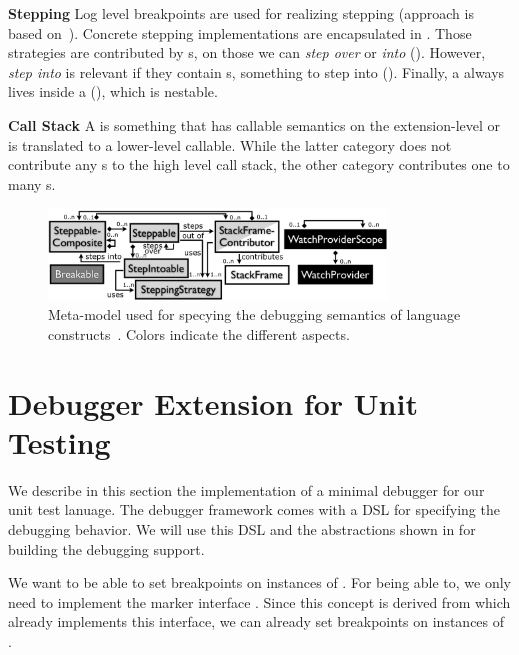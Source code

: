 \noindent \textbf{Stepping} Log level breakpoints are used for realizing
stepping (approach is based on~\cite{Wu06grammar}). Concrete
stepping implementations are encapsulated in
.
Those strategies are contributed by s, on those 
we can \emph{step over} or \emph{into} (\eg {}). 
However, \emph{step into} is relevant if 
they contain s, something to step into
(\eg {}). Finally, a  always lives inside a
 (\eg {}), which is nestable.

\noindent \textbf{Call Stack} A  is
something that has callable semantics on the extension-level or is
translated to a lower-level callable. While the latter category does not
contribute any s to the high level call stack, the other category
contributes one to many s.

\begin{figure}[h]
  \vspace{-2mm}
  \centering
    \includegraphics[width=9cm]{./figures/debugger-concepts.png} 
    \vspace{-2mm}
    \caption{Meta-model used for specying the debugging semantics of language
    constructs~\cite{DBLP:conf/adaEurope/AdaEuropeDeb}. Colors indicate the
    different aspects.} 
  \label{specabs}
  \vspace{-2mm}
\end{figure}

\section{Debugger Extension for Unit Testing}

We describe in this section the implementation of a minimal debugger
for our unit test lanuage. The debugger framework comes with a \ac{DSL}
for specifying the debugging behavior. We will use this \ac{DSL} and the
abstractions shown in  for building the debugging support.

  We want to be able to set breakpoints on instances of
. For being able to, we only need to implement the marker
interface . Since this concept
is derived from  which already implements this
interface, we can already set breakpoints on instances of .

